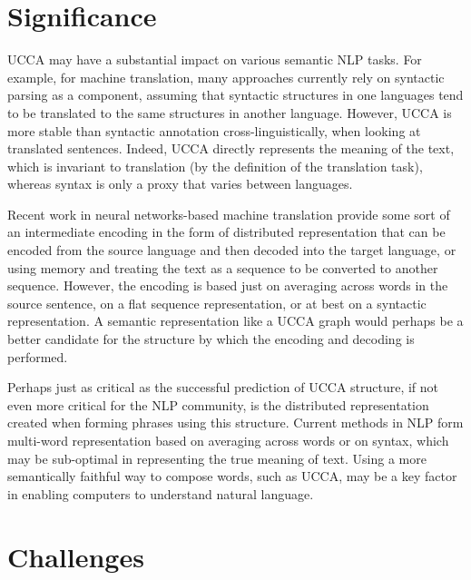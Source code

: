 \documentclass[12pt]{article}
\begin{document}
\section{Significance}\label{sec:significance}

UCCA may have a substantial impact on various semantic NLP tasks. For example,
for machine translation, many approaches currently rely on syntactic parsing as
a component, assuming that syntactic structures in one languages tend to be
translated to the same structures in another language. However, UCCA is more
stable than syntactic annotation cross-linguistically, when looking at
translated sentences\cite{sulem2014thesis}. Indeed, UCCA directly represents
the meaning of the text, which is invariant to translation (by the definition
of the translation task), whereas syntax is only a proxy that varies between
languages.

Recent work in neural networks-based machine translation provide some sort of
an intermediate encoding in the form of distributed representation that can be
encoded from the source language and then decoded into the target
language\cite{zou2013bilingual}, or using memory and treating the text as a
sequence to be converted to another sequence\cite{sutskever2014sequence}.
However, the encoding is based just on averaging across words in the source
sentence, on a flat sequence representation, or at best on a syntactic
representation. A semantic representation like a UCCA graph would perhaps be a
better candidate for the structure by which the encoding and decoding is
performed.

Perhaps just as critical as the successful prediction of UCCA structure, if not
even more critical for the NLP community, is the distributed representation
created when forming phrases using this structure. Current methods in NLP form
multi-word representation based on averaging across words or on syntax, which
may be sub-optimal in representing the true meaning of text. Using a more
semantically faithful way to compose words, such as UCCA, may be a key factor
in enabling computers to understand natural language.



\section{Challenges}\label{sec:challenges}
\end{document}
